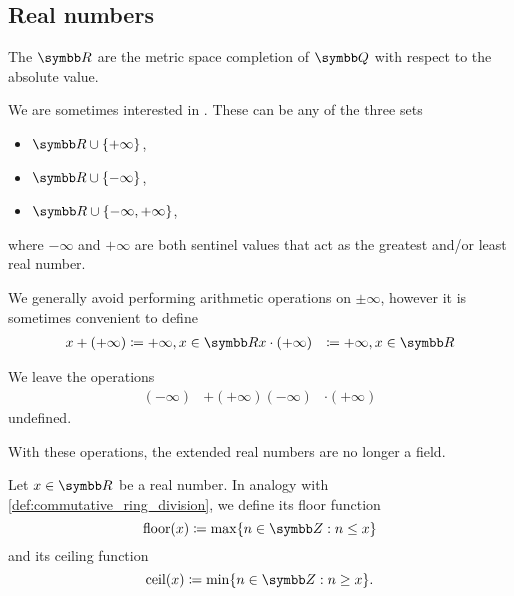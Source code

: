 \subsection{Real numbers}\label{subsec:real_numbers}

\begin{definition}\label{def:real_numbers}
  The  \( \R \) are the metric space completion of \( \Q \) with respect to the absolute value.
\end{definition}

\begin{definition}\label{def:extended_real_numbers}
  We are sometimes interested in . These can be any of the three sets
  \begin{itemize}
    \item \( \R \cup \{ +\infty \} \),
    \item \( \R \cup \{ -\infty \} \),
    \item \( \R \cup \{ -\infty, +\infty \} \),
  \end{itemize}
  where \( -\infty \) and \( +\infty \) are both sentinel values that act as the greatest and/or least real number.

  We generally avoid performing arithmetic operations on \( \pm \infty \), however it is sometimes convenient to define
  \begin{align*}
    x + (+\infty) &\coloneqq +\infty, x \in \R
    x \cdot (+\infty) &\coloneqq +\infty, x \in \R
  \end{align*}

  We leave the operations
  \begin{align*}
    (-\infty) &+ (+\infty)
    (-\infty) &\cdot (+\infty)
  \end{align*}
  undefined.

  With these operations, the extended real numbers are no longer a field.
\end{definition}

\begin{definition}\label{def:floor_ceiling_functions}
  Let \( x \in \R \) be a real number. In analogy with \cref{def:commutative_ring_division}, we define its floor function
  \begin{equation*}
    \Floor(x) \coloneqq \max \{ n \in \Z : n \leq x \}
  \end{equation*}
  and its ceiling function
  \begin{equation*}
    \Ceil(x) \coloneqq \min \{ n \in \Z : n \geq x \}.
  \end{equation*}
\end{definition}

